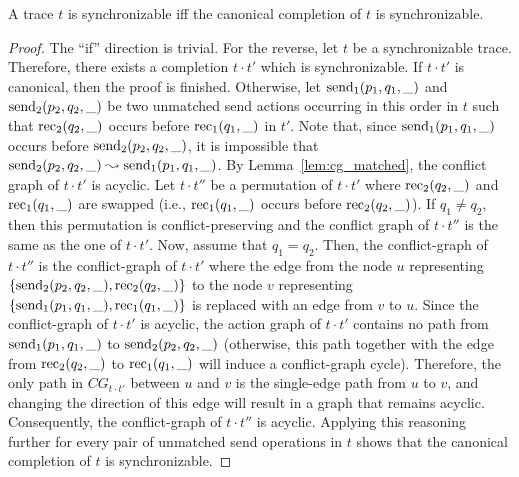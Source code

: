\begin{lemma}\label{lem:synch_canonical}
A trace $t$ is synchronizable if{f} the canonical completion of $t$ is synchronizable.
\end{lemma}
\begin{proof}
The ``if'' direction is trivial. For the reverse, let $t$ be a synchronizable trace. Therefore, there exists a completion $t\cdot t'$ which is synchronizable. If $t\cdot t'$ is canonical, then the proof is finished. Otherwise, let $\mathrm{send}_{1}({p_1,q_1,\_})$ and $\mathrm{send}_{2}({p_2,q_2,\_})$ be two unmatched send actions occurring in this order in $t$ such that $\mathrm{rec}_{2}({q_2,\_})$ occurs before $\mathrm{rec}_{1}({q_1,\_})$ in $t'$. Note that, since $\mathrm{send}_{1}({p_1,q_1,\_})$ occurs before $\mathrm{send}_{2}({p_2,q_2,\_})$, it is impossible that $\mathrm{send}_{2}({p_2,q_2,\_}) \leadsto \mathrm{send}_{1}({p_1,q_1,\_})$.
By Lemma~\ref{lem:cg_matched}, the conflict graph of $t\cdot t'$ is acyclic. 
Let $t\cdot t''$ be a permutation of $t\cdot t'$ where $\mathrm{rec}_{2}({q_2,\_})$ and $\mathrm{rec}_{1}({q_1,\_})$ are swapped (i.e., $\mathrm{rec}_{1}({q_1,\_})$ occurs before $\mathrm{rec}_{2}({q_2,\_})$). If $q_1\neq q_2$, then this permutation is conflict-preserving and the conflict graph of $t\cdot t''$ is the same as the one of $t\cdot t'$. 
Now, assume that $q_1=q_2$. Then, the conflict-graph of $t\cdot t''$ is the conflict-graph of $t\cdot t'$ where the edge from the node $u$ representing $\{\mathrm{send}_{2}({p_2,q_2,\_}),\mathrm{rec}_{2}({q_2,\_})\}$ to the node $v$ representing $\{\mathrm{send}_{1}({p_1,q_1,\_}), \mathrm{rec}_{1}({q_1,\_})\}$ is replaced with an edge from $v$ to $u$.
Since the conflict-graph of $t\cdot t'$ is acyclic, the action graph of $t\cdot t'$ contains no path from $\mathrm{send}_{1}({p_1,q_1,\_})$ to $\mathrm{send}_{2}({p_2,q_2,\_})$ (otherwise, this path together with the edge from $\mathrm{rec}_{2}({q_2,\_})$ to $\mathrm{rec}_{1}({q_1,\_})$ will induce a conflict-graph cycle). Therefore, the only path in $CG_{t\cdot t'}$ between $u$ and $v$ is the single-edge path from $u$ to $v$, and changing the direction of this edge will result in a graph that remains acyclic. Consequently, the conflict-graph of $t\cdot t''$ is acyclic. Applying this reasoning further for every pair of unmatched send operations in $t$ shows that the canonical completion of $t$ is synchronizable.
\end{proof}


